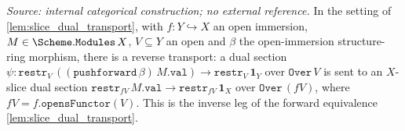\begin{lemma}\leanok
  \label{lem:slice_dual_transport_inv}
  \textit{Source: internal categorical construction; no external reference.}
  In the setting of \cref{lem:slice_dual_transport}, with \(f : Y \hookrightarrow X\) an open
  immersion, \(M \in \Scheme.\mathtt{Modules}\,X\), \(V \subseteq Y\) an open and \(\beta\)
  the open-immersion structure-ring morphism, there is a reverse transport: a dual section
  \(\psi : \mathtt{restr}_V\,((\mathtt{pushforward}\,\beta)\,M.\mathtt{val}) \to
  \mathtt{restr}_V\,\mathbf 1_Y\) over \(\mathtt{Over}\,V\) is sent to an \(X\)-slice dual
  section \(\mathtt{restr}_{fV}\,M.\mathtt{val} \to \mathtt{restr}_{fV}\,\mathbf 1_X\) over
  \(\mathtt{Over}\,(fV)\), where \(fV = f.\mathtt{opensFunctor}(V)\). This is the inverse leg
  of the forward equivalence \cref{lem:slice_dual_transport}.
\end{lemma}
